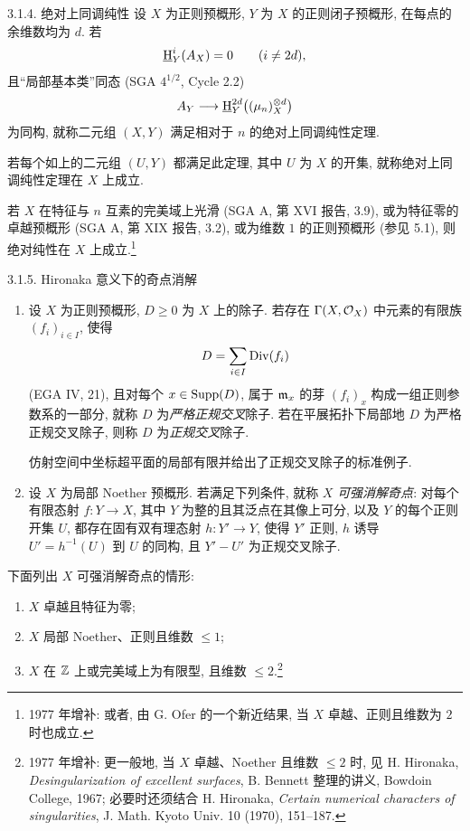 \begin{statement}{3.1.4. 绝对上同调纯性}
设 $X$ 为正则预概形, $Y$ 为 $X$ 的正则闭子预概形, 在每点的余维数均为 $d$. 若
\[
   \underline{\mathrm H}^i_Y(A_X)=0\qquad (i\ne 2d),
\]
且“局部基本类”同态 (SGA $4^{1/2}$, Cycle 2.2)
\[
   A_Y\longrightarrow \underline{\mathrm H}^{2d}_Y\bigl((\mu_n)^{\otimes d}_X\bigr)
\]
为同构, 就称二元组 $(X,Y)$ 满足相对于 $n$ 的绝对上同调纯性定理.

若每个如上的二元组 $(U,Y)$ 都满足此定理, 其中 $U$ 为 $X$ 的开集, 就称绝对上同调纯性定理在 $X$ 上成立.

若 $X$ 在特征与 $n$ 互素的完美域上光滑 (SGA A, 第 XVI 报告, 3.9), 或为特征零的卓越预概形 (SGA A, 第 XIX 报告, 3.2), 或为维数 $1$ 的正则预概形 (参见 5.1), 则绝对纯性在 $X$ 上成立.\footnote{1977 年增补: 或者, 由 G. Ofer 的一个新近结果, 当 $X$ 卓越、正则且维数为 $2$ 时也成立.}
\end{statement}

\begin{statement}{3.1.5. Hironaka 意义下的奇点消解}
\begin{enumerate}[label=\alph*)]
\item 设 $X$ 为正则预概形, $D\ge0$ 为 $X$ 上的除子. 若存在 $\Gamma(X,\mathcal{O}_X)$ 中元素的有限族 $(f_i)_{i\in I}$, 使得
\[
   D=\sum_{i\in I}\operatorname{Div}(f_i)
\]
(EGA IV, 21), 且对每个 $x\in\operatorname{Supp}(D)$, 属于 $\mathfrak m_x$ 的芽 $(f_i)_x$ 构成一组正则参数系的一部分, 就称 $D$ 为\emph{严格正规交叉}除子. 若在平展拓扑下局部地 $D$ 为严格正规交叉除子, 则称 $D$ 为\emph{正规交叉}除子.

仿射空间中坐标超平面的局部有限并给出了正规交叉除子的标准例子.

\item 设 $X$ 为局部 Noether 预概形. 若满足下列条件, 就称 $X$ \emph{可强消解奇点}: 对每个有限态射 $f:Y\to X$, 其中 $Y$ 为整的且其泛点在其像上可分, 以及 $Y$ 的每个正则开集 $U$, 都存在固有双有理态射 $h:Y'\to Y$, 使得 $Y'$ 正则, $h$ 诱导 $U'=h^{-1}(U)$ 到 $U$ 的同构, 且 $Y'-U'$ 为正规交叉除子.
\end{enumerate}
下面列出 $X$ 可强消解奇点的情形:
\begin{enumerate}[label=\alph*)]
\item $X$ 卓越且特征为零;
\item $X$ 局部 Noether、正则且维数 $\le1$;
\item $X$ 在 $\mathbb{Z}$ 上或完美域上为有限型, 且维数 $\le2$.\footnote{1977 年增补: 更一般地, 当 $X$ 卓越、Noether 且维数 $\le2$ 时, 见 H. Hironaka, \emph{Desingularization of excellent surfaces}, B. Bennett 整理的讲义, Bowdoin College, 1967; 必要时还须结合 H. Hironaka, \emph{Certain numerical characters of singularities}, J. Math. Kyoto Univ. 10 (1970), 151--187.}
\end{enumerate}
\end{statement}


